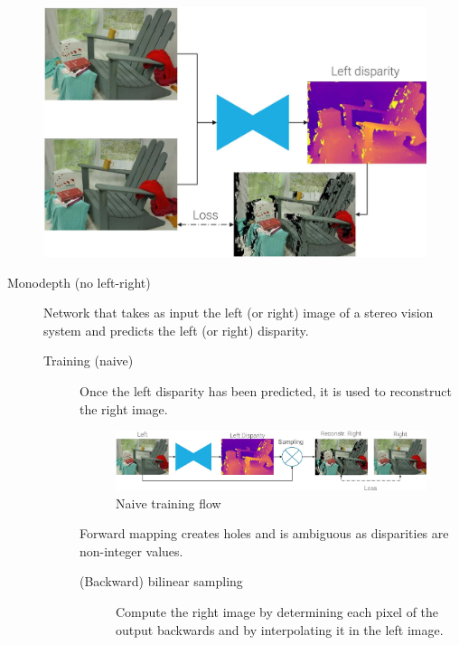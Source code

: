 \begin{description}
\begin{description}
                \begin{figure}[H]
                    \centering
                    \includegraphics[width=0.45\linewidth]{./img/_stereo_pipeline_reconstruction.jpg}
                \end{figure}
        \end{description}
\end{description}

\begin{description}
    \item[Monodepth (no left-right)] 
        Network that takes as input the left (or right) image of a stereo vision system and predicts the left (or right) disparity.

        \begin{description}
            \item[Training (naive)] 
                Once the left disparity has been predicted, it is used to reconstruct the right image.

                \begin{figure}[H]
                    \centering
                    \includegraphics[width=0.8\linewidth]{./img/_monodepth_naive.jpg}
                    \caption{Naive training flow}
                \end{figure}

                \begin{remark}
                    Forward mapping creates holes and is ambiguous as disparities are non-integer values.
                \end{remark}

                \begin{description}
                    \item[(Backward) bilinear sampling] 
                        Compute the right image by determining each pixel of the output backwards and by interpolating it in the left image.


\end{description}
\end{description}
\end{description}
